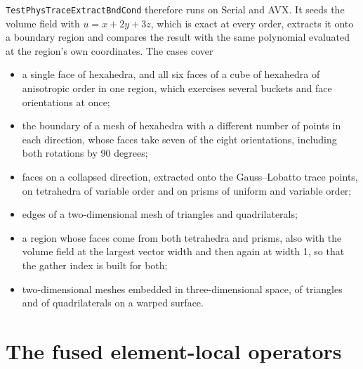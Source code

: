 \texttt{TestPhysTraceExtractBndCond} therefore runs on Serial and AVX. It
seeds the volume field with $u = x + 2y + 3z$, which is exact at every
order, extracts it onto a boundary region and compares the result with the
same polynomial evaluated at the region's own coordinates. The cases cover
\begin{itemize}
  \item a single face of hexahedra, and all six faces of a cube of
    hexahedra of anisotropic order in one region, which exercises several
    buckets and face orientations at once;
  \item the boundary of a mesh of hexahedra with a different number of
    points in each direction, whose faces take seven of the eight
    orientations, including both rotations by 90 degrees;
  \item faces on a collapsed direction, extracted onto the Gauss--Lobatto
    trace points, on tetrahedra of variable order and on prisms of uniform
    and variable order;
  \item edges of a two-dimensional mesh of triangles and quadrilaterals;
  \item a region whose faces come from both tetrahedra and prisms, also with
    the volume field at the largest vector width and then again at width
    1, so that the gather index is built for both;
  \item two-dimensional meshes embedded in three-dimensional space, of
    triangles and of quadrilaterals on a warped surface.
\end{itemize}

\section{The fused element-local operators}
\label{sec:advdifffusedelmt}

